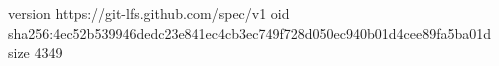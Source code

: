 version https://git-lfs.github.com/spec/v1
oid sha256:4ec52b539946dedc23e841ec4cb3ec749f728d050ec940b01d4cee89fa5ba01d
size 4349
